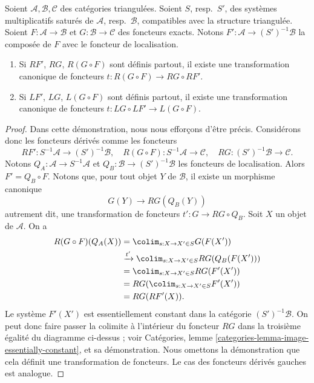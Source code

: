 \begin{lemma}
\label{lemma-compose-derived-functors-general}
Soient $\mathcal{A}, \mathcal{B}, \mathcal{C}$ des catégories triangulées.
Soient $S$, resp.\ $S'$, des systèmes multiplicatifs saturés de
$\mathcal{A}$, resp.\ $\mathcal{B}$, compatibles avec la structure triangulée.
Soient $F : \mathcal{A} \to \mathcal{B}$ et
$G : \mathcal{B} \to \mathcal{C}$ des foncteurs exacts. Notons
$F' : \mathcal{A} \to (S')^{-1}\mathcal{B}$ la composée de $F$ avec le
foncteur de localisation.
\begin{enumerate}
\item Si $RF'$, $RG$, $R(G \circ F)$ sont définis partout, il existe une
transformation canonique de foncteurs
$t : R(G \circ F) \longrightarrow RG \circ RF'$.
\item Si $LF'$, $LG$, $L(G \circ F)$ sont définis partout, il existe une
transformation canonique de foncteurs
$t : LG \circ LF' \to L(G \circ F)$.
\end{enumerate}
\end{lemma}

\begin{proof}
Dans cette démonstration, nous nous efforçons d'être précis. Considérons donc
les foncteurs dérivés comme les foncteurs
$$
RF' : S^{-1}\mathcal{A} \to (S')^{-1}\mathcal{B}, \quad
R(G \circ F) : S^{-1}\mathcal{A} \to \mathcal{C}, \quad
RG : (S')^{-1}\mathcal{B} \to \mathcal{C}.
$$
Notons $Q_A : \mathcal{A} \to S^{-1}\mathcal{A}$ et
$Q_B : \mathcal{B} \to (S')^{-1}\mathcal{B}$ les foncteurs de localisation.
Alors $F' = Q_B \circ F$. Notons que, pour tout objet $Y$ de $\mathcal{B}$,
il existe un morphisme canonique
$$
G(Y) \longrightarrow RG(Q_B(Y))
$$
autrement dit, une transformation de foncteurs
$t' : G \to RG \circ Q_B$. Soit $X$ un objet de $\mathcal{A}$. On a
\begin{align*}
R(G \circ F)(Q_A(X))
& = \colim_{s : X \to X' \in S} G(F(X')) \\
& \xrightarrow{t'} \colim_{s : X \to X' \in S} RG(Q_B(F(X'))) \\
& = \colim_{s : X \to X' \in S} RG(F'(X')) \\
& = RG(\colim_{s : X \to X' \in S} F'(X')) \\
& = RG(RF'(X)).
\end{align*}
Le système $F'(X')$ est essentiellement constant dans la catégorie
$(S')^{-1}\mathcal{B}$. On peut donc faire passer la colimite à l'intérieur du
foncteur $RG$ dans la troisième égalité du diagramme ci-dessus ; voir
Catégories, lemme \ref{categories-lemma-image-essentially-constant}, et sa
démonstration. Nous omettons la démonstration que cela définit une
transformation de foncteurs. Le cas des foncteurs dérivés gauches est analogue.
\end{proof}





